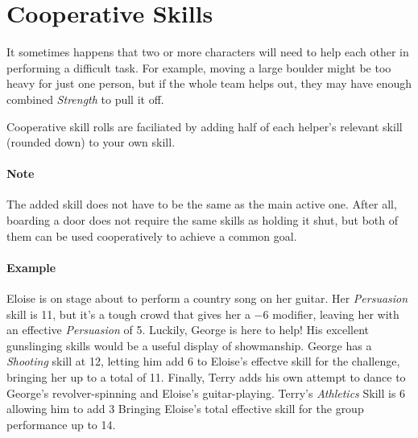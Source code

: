 \section{Cooperative Skills}
It sometimes happens that two or more characters will need to help each other in performing a difficult task.
For example, moving a large boulder might be too heavy for just one person, but if the whole team helps out, they may have enough combined \textit{Strength} to pull it off.

Cooperative skill rolls are faciliated by adding half of each helper's relevant skill (rounded down) to your own skill.

\paragraph{Note} The added skill does not have to be the same as the main active one. 
After all, boarding a door does not require the same skills as holding it shut, but both of them can be used cooperatively to achieve a common goal.

\paragraph{Example}
Eloise is on stage about to perform a country song on her guitar.
Her \textit{Persuasion} skill is 11, but it's a tough crowd that gives her a $-6$ modifier, leaving her with an effective \textit{Persuasion} of 5.
Luckily, George is here to help!
His excellent gunslinging skills would be a useful display of showmanship.
George has a \textit{Shooting} skill at 12, letting him add 6 to Eloise's effectve skill for the challenge, bringing her up to a total of 11.
Finally, Terry adds his own attempt to dance to George's revolver-spinning and Eloise's guitar-playing. 
Terry's \textit{Athletics} Skill is 6 allowing him to add 3 Bringing Eloise's total effective skill for the group performance up to 14.